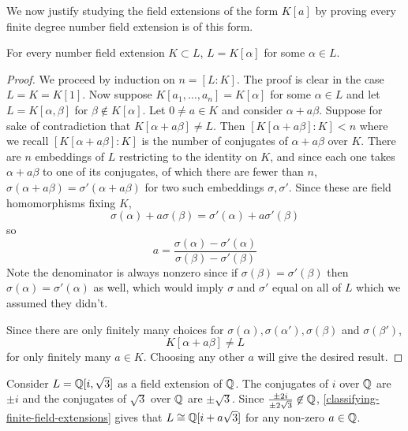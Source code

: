 We now justify studying the field extensions of the form $K[a]$ by proving every finite degree number field extension is of this form.

\begin{theorem}\label{classifying-finite-field-extensions}
For every number field extension $K\subset L$, $L=K[\alpha]$ for some $\alpha \in L$.
\end{theorem}
\begin{proof}
We proceed by induction on $n=[L:K]$. The proof is clear in the case $L=K=K[1]$. Now suppose $K[a_1,\dots,a_{n}]=K[\alpha]$ for some $\alpha \in L$ and let $L=K[\alpha,\beta]$ for $\beta\not\in K[\alpha]$. Let $0\neq a\in K$ and consider $\alpha+a\beta$. Suppose for sake of contradiction that $K[\alpha+a\beta]\neq L$. Then $[K[\alpha+a\beta]:K]<n$ where we recall $[K[\alpha+a\beta]:K]$ is the number of conjugates of $\alpha+a\beta$ over $K$. There are $n$ embeddings of $L$ restricting to the identity on $K$, and since each one takes $\alpha+a\beta$ to one of its conjugates, of which there are fewer than $n$, $\sigma(\alpha+a\beta)=\sigma'(\alpha+a\beta)$ for two such embeddings $\sigma,\sigma'$. Since these are field homomorphisms fixing $K$, 
$$\sigma(\alpha)+a\sigma(\beta)=\sigma'(\alpha)+a\sigma'(\beta)$$
so
$$a=\frac{\sigma(\alpha)-\sigma'(\alpha)}{\sigma(\beta)-\sigma'(\beta)}$$
Note the denominator is always nonzero since if $\sigma(\beta)=\sigma'(\beta)$ then $\sigma(\alpha)=\sigma'(\alpha)$ as well, which would imply $\sigma$ and $\sigma'$ equal on all of $L$ which we assumed they didn't.

Since there are only finitely many choices for $\sigma(\alpha),\sigma(\alpha'),\sigma(\beta)$ and $\sigma(\beta')$,
$$K[\alpha+a\beta]\neq L$$
for only finitely many $a\in K$. Choosing any other $a$ will give the desired result.
\end{proof}

\begin{example}
Consider $L=\mathbb{Q}[i,\sqrt{3}]$ as a field extension of $\mathbb{Q}$. The conjugates of $i$ over $\mathbb{Q}$ are $\pm i$ and the conjugates of $\sqrt{3}$ over $\mathbb{Q}$ are $\pm \sqrt{3}$. Since $\frac{\pm 2i}{\pm 2\sqrt{3}}\not \in \mathbb{Q}$, \cref{classifying-finite-field-extensions} gives that $L\cong \mathbb{Q}[i+a\sqrt{3}]$ for any non-zero $a\in \mathbb{Q}$.
$$$$
\end{example}

